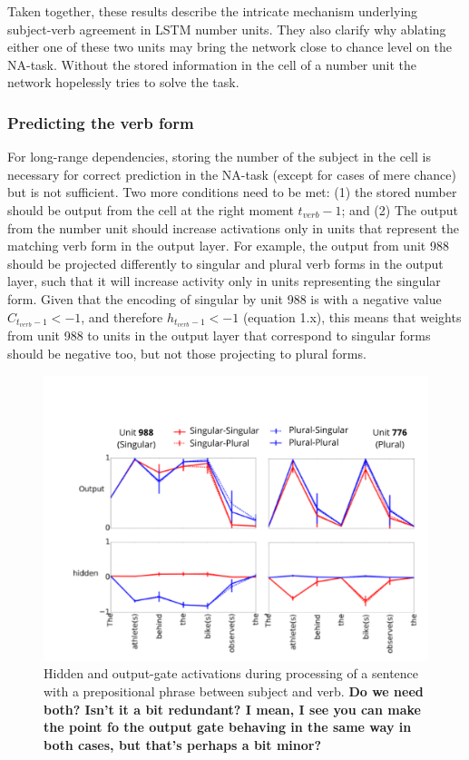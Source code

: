 Taken together, these results describe the intricate mechanism underlying subject-verb agreement in LSTM number units. 
They also clarify why ablating either one of these two units may bring the network close to chance level on the NA-task. 
Without the stored information in the cell of a number unit the network hopelessly tries to solve the task.



\subsubsection{Predicting the verb form}
For long-range dependencies, storing the number of the subject in the cell is necessary for correct prediction in the NA-task (except for cases of mere chance) but is not sufficient. 
Two more conditions need to be met: (1) the stored number should be output from the cell at the right moment $t_{verb}-1$; and (2) The output from the number unit should increase activations only in units that represent the matching verb form in the output layer. 
For example, the output from unit 988 should be projected differently to singular and plural verb forms in the output layer, such that it will increase activity only in units representing the singular form. 
Given that the encoding of singular by unit 988 is with a negative value $C_{t_{verb}-1}<-1$, and therefore $h_{t_{verb}-1}<-1$ (equation 1.x), this means that weights from unit 988 to units in the output layer that correspond to singular forms should be negative too, but not those projecting to plural forms.


\begin{figure}[ht]
\includegraphics[width=\textwidth]{Figures/Figure3_number_units_775_987_output_hidden.png}
\caption{Hidden and output-gate activations during processing of a sentence with a prepositional phrase between subject and verb. \textbf{Do we need both? Isn't it a bit redundant? I mean, I see you can make the point fo the output gate behaving in the same way in both cases, but that's perhaps a bit minor?}}
\end{figure}

